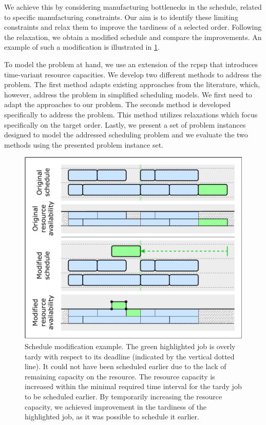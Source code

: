 We achieve this by considering manufacturing bottlenecks in the schedule,
related to specific manufacturing constraints.
Our aim is to identify these limiting constraints
and relax them to improve the tardiness of a selected order.
Following the relaxation, we obtain a modified schedule and compare the improvements.
An example of such a modification is illustrated in \cref{fig:schedule-change}.

To model the problem at hand, we use an extension of the \acf{rcpsp}
that introduces time-variant resource capacities.
We develop two different methods to address the problem.
The first method adapts existing approaches from the literature,
which, however, address the problem in simplified scheduling models.
We first need to adapt the approaches to our problem.
The seconds method is developed specifically to address the problem.
This method utilizes relaxations which focus specifically on the target order.
Lastly, we present a set of problem instances designed to model the addressed scheduling problem
and we evaluate the two methods using the presented problem instance set.

\begin{figure}[tb]
    \centering
    \includegraphics[width=\textwidth]{img/Schedule-Change.pdf}
    \caption{
        Schedule modification example.
        The green highlighted job is overly tardy with respect to its deadline (indicated by the vertical dotted line).
        It could not have been scheduled earlier due to the lack of remaining capacity on the resource.
        The resource capacity is increased within the minimal required time interval
        for the tardy job to be scheduled earlier.
        By temporarily increasing the resource capacity,
        we achieved improvement in the tardiness of the highlighted job,
        as it was possible to schedule it earlier.
        }
    \label{fig:schedule-change}
\end{figure}

